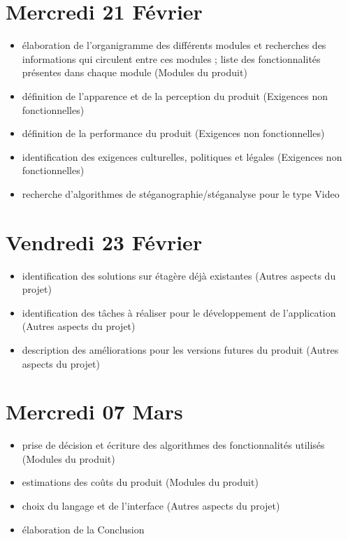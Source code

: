 \documentclass[11pt]{article}
\begin{document}
\section{Mercredi 21 Février}
\begin {itemize}
\item élaboration de l'organigramme des différents modules et recherches des informations qui circulent entre ces modules ; liste des fonctionnalités présentes dans chaque module (Modules du produit)
\item définition de l'apparence et de la perception du produit (Exigences non fonctionnelles)
\item définition de la performance du produit (Exigences non fonctionnelles)
\item identification des exigences culturelles, politiques et légales (Exigences non fonctionnelles)
\item recherche d'algorithmes de stéganographie/stéganalyse pour le type Video
\end{itemize}

\section{Vendredi 23 Février}
\begin {itemize}
\item identification des solutions sur étagère déjà existantes (Autres aspects du projet)
\item identification des tâches à réaliser pour le développement de l'application (Autres aspects du projet)
\item description des améliorations pour les versions futures du produit (Autres aspects du projet)
\end{itemize}

\section{Mercredi 07 Mars}
\begin {itemize}
\item prise de décision et écriture des algorithmes des fonctionnalités utilisés (Modules du produit)
\item estimations des coûts du produit (Modules du produit)
\item choix du langage et de l'interface (Autres aspects du projet)  
\item élaboration de la Conclusion
\end{itemize}
\end{document}
